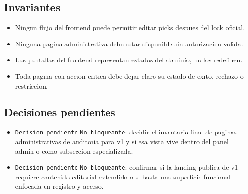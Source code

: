 \subsection{Invariantes}

\begin{itemize}
  \item Ningun flujo del frontend puede permitir editar picks despues del lock oficial.
  \item Ninguna pagina administrativa debe estar disponible sin autorizacion valida.
  \item Las pantallas del frontend representan estados del dominio; no los redefinen.
  \item Toda pagina con accion critica debe dejar claro su estado de exito, rechazo o restriccion.
\end{itemize}

\subsection{Decisiones pendientes}

\begin{itemize}
  \item \texttt{Decision pendiente} \texttt{No bloqueante}: decidir el inventario final de paginas administrativas de auditoria para v1 y si esa vista vive dentro del panel admin o como subseccion especializada.
  \item \texttt{Decision pendiente} \texttt{No bloqueante}: confirmar si la landing publica de v1 requiere contenido editorial extendido o si basta una superficie funcional enfocada en registro y acceso.
\end{itemize}
